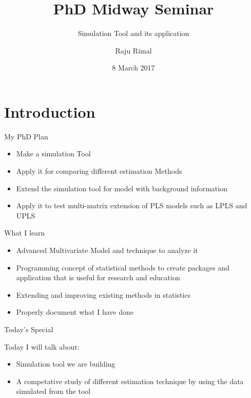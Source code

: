 \documentclass[ignorenonframetext,]{beamer}
\title{PhD Midway Seminar}
\subtitle{Simulation Tool and its application}
\author{Raju Rimal}
\institute{\textbf{Supervisors}\\
Solve Sæbø, Tryge Almøy}
\date{8 March 2017}
\providecommand{\tightlist}{%
  \setlength{\itemsep}{0pt}\setlength{\parskip}{0pt}}
\begin{document}
\frame{\titlepage}

\section{Introduction}\label{introduction}

\begin{frame}{My PhD Plan}

\hypertarget{left}{}

\hypertarget{right}{}
\begin{itemize}[<+->]
\tightlist
\item
  Make a {simulation Tool}
\item
  Apply it for comparing different estimation Methods
\item
  Extend the simulation tool for model with background information
\item
  Apply it to test multi-matrix extension of PLS models such as LPLS and
  UPLS
\end{itemize}

\end{frame}

\begin{frame}{What I learn}

\begin{itemize}[<+->]
\tightlist
\item
  Advanced Multivariate Model and technique to analyze it
\item
  Programming concept of statistical methods to create packages and
  application that is useful for research and education
\item
  Extending and improving existing methods in statistics
\item
  Properly document what I have done
\end{itemize}

\end{frame}

\begin{frame}{Today's Special}

Today I will talk about:

\begin{itemize}[<+->]
\tightlist
\item
  Simulation tool we are building
\item
  A competative study of different estimation technique by using the
  data simulated from the tool
\end{itemize}

\end{frame}
\end{document}

